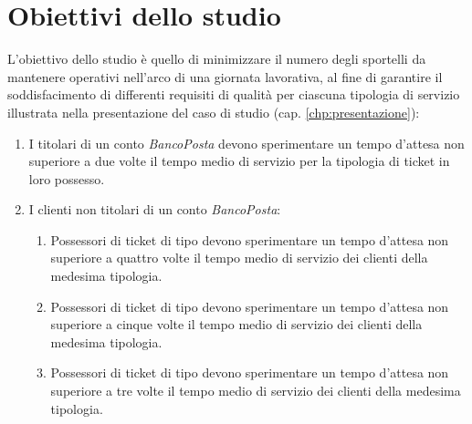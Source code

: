 \chapter{Obiettivi dello studio}\label{chp:obiettivi}
L'obiettivo dello studio è quello di minimizzare il numero degli sportelli da mantenere operativi nell'arco di una giornata lavorativa, al fine di garantire il soddisfacimento di differenti requisiti di qualità per ciascuna tipologia di servizio illustrata nella presentazione del caso di studio (cap. \ref{chp:presentazione}):

\begin{enumerate}[label=QoS-\arabic*), align=left, leftmargin=*]
\item I titolari di un conto \textsl{BancoPosta} devono sperimentare un tempo d'attesa non superiore a due volte il tempo medio di servizio per la tipologia di ticket in loro possesso.
\item I clienti non titolari di un conto \textsl{BancoPosta}:
\begin{enumerate}
\item Possessori di ticket di tipo \uo{} devono sperimentare un tempo d'attesa non superiore a quattro volte il tempo medio di servizio dei clienti della medesima tipologia.
\item Possessori di ticket di tipo \pp{} devono sperimentare un tempo d'attesa non superiore a cinque volte il tempo medio di servizio dei clienti della medesima tipologia.
\item Possessori di ticket di tipo \sr{} devono sperimentare un tempo d'attesa non superiore a tre volte il tempo medio di servizio dei clienti della medesima tipologia.
\end{enumerate}
\end{enumerate}
